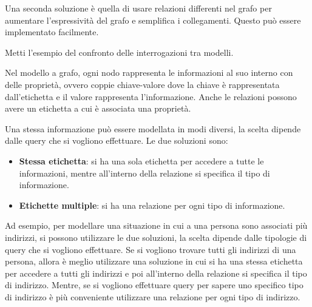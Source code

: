 Una seconda soluzione è quella di usare relazioni differenti nel grafo per aumentare
l'espressività del grafo e semplifica i collegamenti. Questo può essere implementato
facilmente.

\begin{esempio}
      Metti l'esempio del confronto delle interrogazioni tra modelli.
\end{esempio}

Nel modello a grafo, ogni nodo rappresenta le informazioni al suo interno con 
delle proprietà, ovvero coppie chiave-valore dove la chiave è rappresentata 
dall'etichetta e il valore rappresenta l'informazione. Anche le relazioni possono
avere un etichetta a cui è associata una proprietà.

Una stessa informazione può essere modellata in modi diversi, la scelta dipende
dalle query che si vogliono effettuare. Le due soluzioni sono:
\begin{itemize}
      \item \textbf{Stessa etichetta}: si ha una sola etichetta per accedere
            a tutte le informazioni, mentre all'interno della relazione si specifica
            il tipo di informazione.
      \item \textbf{Etichette multiple}: si ha una relazione per ogni tipo di
            informazione.
\end{itemize}
Ad esempio, per modellare una situazione in cui a una persona sono associati più
indirizzi, si possono utilizzare le due soluzioni, la scelta dipende dalle 
tipologie di query che si vogliono effettuare. Se si vogliono trovare tutti 
gli indirizzi di una persona, allora è meglio utilizzare una soluzione in cui 
si ha una stessa etichetta per accedere a tutti gli indirizzi e poi all'interno 
della relazione si specifica il tipo di indirizzo. Mentre, se si vogliono 
effettuare query per sapere uno specifico tipo di indirizzo è più conveniente
utilizzare una relazione per ogni tipo di indirizzo. 